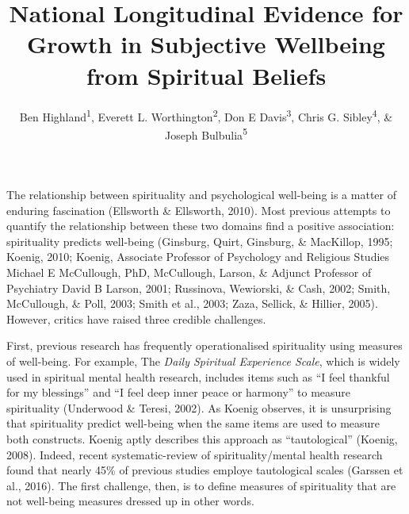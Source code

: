 \documentclass[
  english,
  man]{apa6}
\title{National Longitudinal Evidence for Growth in Subjective Wellbeing from Spiritual Beliefs}
\author{Ben Highland\textsuperscript{1}, Everett L. Worthington\textsuperscript{2}, Don E Davis\textsuperscript{3}, Chris G. Sibley\textsuperscript{4}, \& Joseph Bulbulia\textsuperscript{5}}
\date{}
\affiliation{\phantom{0}}
\begin{document}
\maketitle

The relationship between spirituality and psychological well-being is a matter of enduring fascination (Ellsworth \& Ellsworth, 2010). Most previous attempts to quantify the relationship between these two domains find a positive association: spirituality predicts well-being (Ginsburg, Quirt, Ginsburg, \& MacKillop, 1995; Koenig, 2010; Koenig, Associate Professor of Psychology and Religious Studies Michael E McCullough, PhD, McCullough, Larson, \& Adjunct Professor of Psychiatry David B Larson, 2001; Russinova, Wewiorski, \& Cash, 2002; Smith, McCullough, \& Poll, 2003; Smith et al., 2003; Zaza, Sellick, \& Hillier, 2005). However, critics have raised three credible challenges.

First, previous research has frequently operationalised spirituality using measures of well-being. For example, The \emph{Daily Spiritual Experience Scale}, which is widely used in spiritual mental health research, includes items such as \enquote{I feel thankful for my blessings} and \enquote{I feel deep inner peace or harmony} to measure spirituality (Underwood \& Teresi, 2002). As Koenig observes, it is unsurprising that spirituality predict well-being when the same items are used to measure both constructs. Koenig aptly describes this approach as \enquote{tautological} (Koenig, 2008). Indeed, recent systematic-review of spirituality/mental health research found that nearly 45\% of previous studies employe tautological scales (Garssen et al., 2016). The first challenge, then, is to define measures of spirituality that are not well-being measures dressed up in other words.
\end{document}
